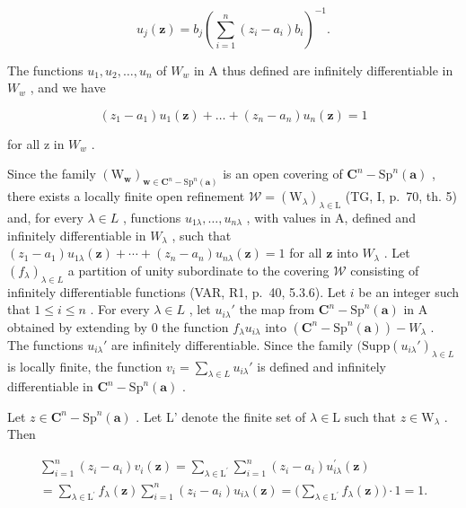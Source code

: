 \[
u _ {j} (\boldsymbol {z}) = b _ {j} \left(\sum_ {i = 1} ^ {n} (z _ {i} - a _ {i}) b _ {i}\right) ^ {- 1}.
\]

The functions \(u_{1}, u_{2}, \ldots, u_{n}\) of \(W_{w}\) in A thus defined are infinitely differentiable in \(W_{w}\) , and we have

\[
(z _ {1} - a _ {1}) u _ {1} (\boldsymbol {z}) + \dots + (z _ {n} - a _ {n}) u _ {n} (\boldsymbol {z}) = 1
\]

for all z in \(W_{w}\) .

Since the family \((\mathrm{W}_{\boldsymbol{w}})_{\boldsymbol{w}\in\mathbf{C}^{n}-\mathrm{Sp}^{n}(\boldsymbol{a})}\) is an open covering of \(\mathbf{C}^{n}-\mathrm{Sp}^{n}(\boldsymbol{a})\) , there exists a locally finite open refinement \(\mathscr{W}=(\mathrm{W}_{\lambda})_{\lambda\in\mathrm{L}}\) (TG, I, p.~70, th. 5) and, for every \(\lambda\in L\) , functions \(u_{1\lambda},\ldots,u_{n\lambda}\) , with values in A, defined and infinitely differentiable in \(W_{\lambda}\) , such that \((z_{1}-a_{1})u_{1\lambda}(\boldsymbol{z})+\cdots+(z_{n}-a_{n})u_{n\lambda}(\boldsymbol{z})=1\) for all \(\boldsymbol{z}\) into \(W_{\lambda}\) . Let \((f_{\lambda})_{\lambda \in L}\) a partition of unity subordinate to the covering \(\mathscr{W}\) consisting of infinitely differentiable functions (VAR, R1, p.~40, 5.3.6). Let \(i\) be an integer such that \(1 \leqslant i \leqslant n\) . For every \(\lambda \in L\) , let \(u_{i\lambda}'\) the map from \(\mathbf{C}^n - \mathrm{Sp}^n(\boldsymbol{a})\) in A obtained by extending by 0 the function \(f_{\lambda}u_{i\lambda}\) into \((\mathbf{C}^n - \mathrm{Sp}^n(\boldsymbol{a})) - W_{\lambda}\) . The functions \(u_{i\lambda}'\) are infinitely differentiable. Since the family \((\mathrm{Supp}(u_{i\lambda}')_{\lambda \in L}\) is locally finite, the function \(v_i = \sum_{\lambda \in L} u_{i\lambda}'\) is defined and infinitely differentiable in \(\mathbf{C}^n - \mathrm{Sp}^n(\boldsymbol{a})\) .

Let \(z \in \mathbf{C}^n - \mathrm{Sp}^n(\boldsymbol{a})\) . Let L' denote the finite set of \(\lambda \in \mathrm{L}\) such that \(z \in \mathrm{W}_{\lambda}\) . Then

\[
\begin{array}{c} \sum_ {i = 1} ^ {n} (z _ {i} - a _ {i}) v _ {i} (\boldsymbol {z}) = \sum_ {\lambda \in \mathrm{L} ^ {\prime}} \sum_ {i = 1} ^ {n} (z _ {i} - a _ {i}) u _ {i \lambda} ^ {\prime} (\boldsymbol {z}) \\ = \sum_ {\lambda \in \mathrm{L} ^ {\prime}} f _ {\lambda} (\boldsymbol {z}) \sum_ {i = 1} ^ {n} (z _ {i} - a _ {i}) u _ {i \lambda} (\boldsymbol {z}) = \bigg (\sum_ {\lambda \in \mathrm{L} ^ {\prime}} f _ {\lambda} (\boldsymbol {z}) \bigg) \cdot 1 = 1. \end{array}
\]

